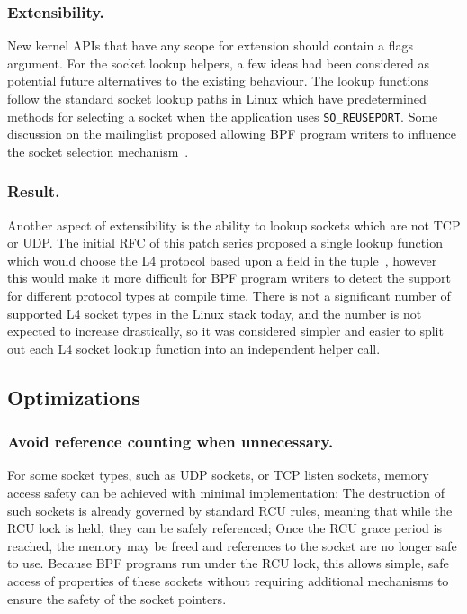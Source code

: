 \documentclass[10pt,sigconf,authorversion]{lpc}
\begin{document}
\subsubsection{Extensibility.}

New kernel APIs that have any scope for extension should contain a flags
argument. For the socket lookup helpers, a few ideas had been considered as
potential future alternatives to the existing behaviour. The lookup functions
follow the standard socket lookup paths in Linux which have predetermined
methods for selecting a socket when the application uses \verb+SO_REUSEPORT+.
Some discussion on the mailinglist proposed allowing BPF program writers to
influence the socket selection mechanism~\cite{netdev-sk-select}.

\subsubsection{Result.}

Another aspect of extensibility is the ability to lookup sockets which are not
TCP or UDP. The initial RFC of this patch series proposed a single lookup
function which would choose the L4 protocol based upon a field in the
tuple~\cite{sk-lookup-rfc}, however this would make it more difficult for BPF
program writers to detect the support for different protocol types at compile
time. There is not a significant number of supported L4 socket types in the
Linux stack today, and the number is not expected to increase drastically, so
it was considered simpler and easier to split out each L4 socket lookup
function into an independent helper call.

\subsection{Optimizations}

\subsubsection{Avoid reference counting when unnecessary.}

For some socket types, such as UDP sockets, or TCP listen sockets, memory
access safety can be achieved with minimal implementation: The destruction of
such sockets is already governed by standard RCU rules, meaning that while the
RCU lock is held, they can be safely referenced; Once the RCU grace period is
reached, the memory may be freed and references to the socket are no longer
safe to use. Because BPF programs run under the RCU lock, this allows simple,
safe access of properties of these sockets without requiring additional
mechanisms to ensure the safety of the socket pointers.
\end{document}
